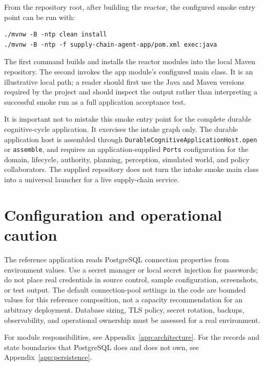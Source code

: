 From the repository root, after building the reactor, the configured smoke entry point can be run with:

\begin{lstlisting}[basicstyle=\ttfamily\small]
./mvnw -B -ntp clean install
./mvnw -B -ntp -f supply-chain-agent-app/pom.xml exec:java
\end{lstlisting}

The first command builds and installs the reactor modules into the local Maven repository. The second invokes the app module's configured main class. It is an illustrative local path; a reader should first use the Java and Maven versions required by the project and should inspect the output rather than interpreting a successful smoke run as a full application acceptance test.

It is important not to mistake this smoke entry point for the complete durable cognitive-cycle application. It exercises the intake graph only. The durable application host is assembled through \texttt{DurableCognitiveApplicationHost.open} or \texttt{assemble}, and requires an application-supplied \texttt{Ports} configuration for the domain, lifecycle, authority, planning, perception, simulated world, and policy collaborators. The supplied repository does not turn the intake smoke main class into a universal launcher for a live supply-chain service.

\section{Configuration and operational caution}

The reference application reads PostgreSQL connection properties from environment values. Use a secret manager or local secret injection for passwords; do not place real credentials in source control, sample configuration, screenshots, or test output. The default connection-pool settings in the code are bounded values for this reference composition, not a capacity recommendation for an arbitrary deployment. Database sizing, TLS policy, secret rotation, backups, observability, and operational ownership must be assessed for a real environment.

For module responsibilities, see Appendix~\ref{app:architecture}. For the records and state boundaries that PostgreSQL does and does not own, see Appendix~\ref{app:persistence}.
